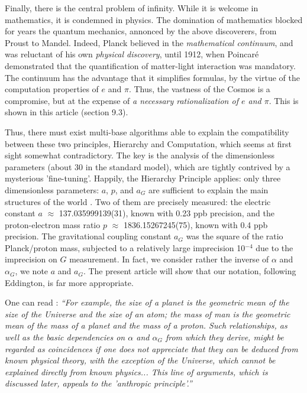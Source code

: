 \documentclass[twoside,draft]{article}
\begin{document}
\begin{sloppypar}
Finally, there is the central problem of infinity. While it is welcome in mathematics, it is condemned in physics. The domination of mathematics blocked for years the quantum mechanics, annonced by the above discoverers, from Proust to Mandel. Indeed, Planck believed in the \textit{mathematical continuum}, and was reluctant of his own \textit{physical discovery}, until 1912, when Poincar\'{e} demonstrated that the quantification of matter-light interaction was mandatory\cite{Sanchez1}. The continuum has the advantage that it simplifies formulas, by the virtue of the computation properties of $e$ and $\pi$. Thus, the vastness of the Cosmos is a compromise, but at the expense of \textit{a necessary rationalization of $e$ and $\pi$}. This is shown in this article (section 9.3).

Thus, there must exist multi-base algorithms able to explain the compatibility between these two principles, Hierarchy and Computation, which seems at first sight somewhat contradictory. The key is the analysis of the dimensionless parameters (about 30 in the standard model), which are tightly contrived by a mysterious 'fine-tuning'. Happily, the Hierarchy Principle applies:  only three dimensionless parameters: $a$, $p$, and $a_{G}$ are sufficient to explain the main structures of the world \cite{Carr}. Two of them are precisely measured: the electric constant $a$ $\approx$ 137.035999139(31), known with 0.23 ppb precision, and the proton-electron mass ratio $p$ $\approx$ 1836.15267245(75), known with 0.4 ppb precision. The gravitational coupling constant $a_{G}$ was the square of the ratio Planck/proton mass, subjected to a relatively large imprecision 10$^{-4}\!$ due to the imprecision on $G$ measurement. In fact, we consider rather the inverse of $\alpha$ and $\alpha_G$, we note $a$ and $a_G$. The present article will show that our notation, following Eddington\cite{Eddington}, is far more appropriate.

One can read \cite{Carr}: \textit{“For example, the size of a planet is the geometric mean of the size of the Universe and the size of an atom; the mass of man is the geometric mean of the mass of a planet and the mass of a proton. Such relationships, as well as the basic dependencies on $\alpha$ and $\alpha_G$ from which they derive, might be regarded as coincidences if one does not appreciate that they can be deduced from known physical theory, with the exception of the Universe, which cannot be explained directly from known physics... This line of arguments, which is discussed later, appeals to the 'anthropic principle'.”}


\end{sloppypar}
\end{document}
